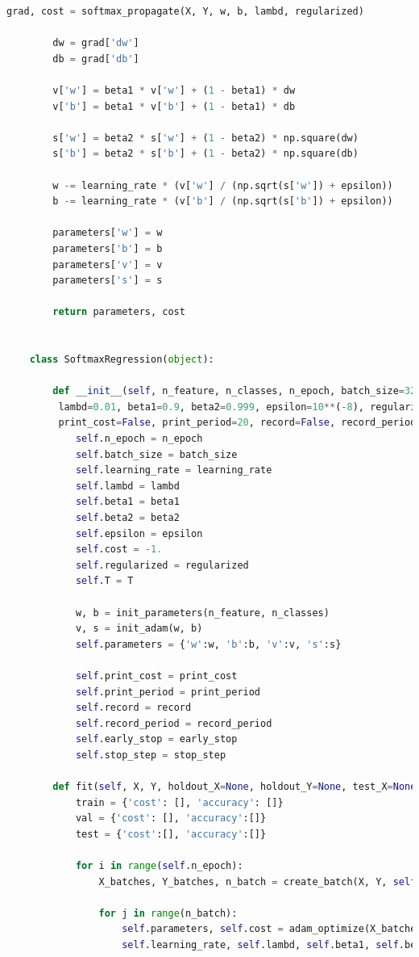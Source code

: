 \documentclass{article}
\begin{document}
\begin{lstlisting}[language=Python, breaklines]
	    grad, cost = softmax_propagate(X, Y, w, b, lambd, regularized)
	
	    dw = grad['dw']
	    db = grad['db']
	
	    v['w'] = beta1 * v['w'] + (1 - beta1) * dw
	    v['b'] = beta1 * v['b'] + (1 - beta1) * db
	
	    s['w'] = beta2 * s['w'] + (1 - beta2) * np.square(dw)
	    s['b'] = beta2 * s['b'] + (1 - beta2) * np.square(db)
	
	    w -= learning_rate * (v['w'] / (np.sqrt(s['w']) + epsilon))
	    b -= learning_rate * (v['b'] / (np.sqrt(s['b']) + epsilon))
	
	    parameters['w'] = w
	    parameters['b'] = b
	    parameters['v'] = v
	    parameters['s'] = s
	
	    return parameters, cost
	
	
	class SoftmaxRegression(object):
	
	    def __init__(self, n_feature, n_classes, n_epoch, batch_size=32, learning_rate=0.001,\
	     lambd=0.01, beta1=0.9, beta2=0.999, epsilon=10**(-8), regularized=2, T=0.,\
	     print_cost=False, print_period=20, record=False, record_period=20, early_stop=False, stop_step=3):
	        self.n_epoch = n_epoch
	        self.batch_size = batch_size
	        self.learning_rate = learning_rate
	        self.lambd = lambd
	        self.beta1 = beta1
	        self.beta2 = beta2
	        self.epsilon = epsilon
	        self.cost = -1.
	        self.regularized = regularized
	        self.T = T
	
	        w, b = init_parameters(n_feature, n_classes)
	        v, s = init_adam(w, b)
	        self.parameters = {'w':w, 'b':b, 'v':v, 's':s}
	
	        self.print_cost = print_cost
	        self.print_period = print_period
	        self.record = record
	        self.record_period = record_period
	        self.early_stop = early_stop
	        self.stop_step = stop_step
	
	    def fit(self, X, Y, holdout_X=None, holdout_Y=None, test_X=None, test_Y=None):
	        train = {'cost': [], 'accuracy': []}
	        val = {'cost': [], 'accuracy':[]}
	        test = {'cost':[], 'accuracy':[]}
	
	        for i in range(self.n_epoch):
	            X_batches, Y_batches, n_batch = create_batch(X, Y, self.batch_size)
	
	            for j in range(n_batch):
	                self.parameters, self.cost = adam_optimize(X_batches[j], Y_batches[j], self.parameters, \
	                self.learning_rate, self.lambd, self.beta1, self.beta2, self.epsilon, self.regularized)
	

\end{lstlisting}
\end{document}
